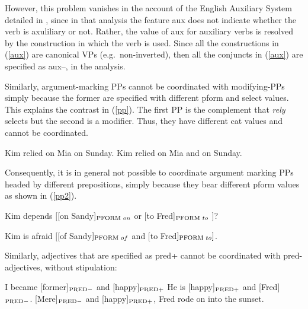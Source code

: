 \documentclass[output=paper]{langsci/langscibook}
\begin{document}
\noindent
However, this problem vanishes in the account of the English Auxiliary System detailed in \citet{SagEtAl20}, since in that analysis
the feature {\sc aux} does not indicate whether the verb is axuliliary or not. Rather, the value of {\sc aux} for auxiliary verbs is resolved by the construction in which the verb is used. Since all the constructions in (\ref{aux}) are canonical VPs (e.g.\ non-inverted), then 
all the conjuncts in (\ref{aux}) are specified as {\sc aux--}, in
the \citet{SagEtAl20} analysis.




Similarly, argument-marking PPs cannot be coordinated with modifying-PPs simply because the former are specified with different  {\sc pform} and {\sc select} values. This explains the contrast
in (\ref{pp}). The first PP is the complement that {\it rely}
selects but the second is a modifier. Thus, they have different {\sc cat} values and cannot be coordinated.


\begin{exe}
\ex
\begin{xlista}
\ex Kim relied on Mia on Sunday.
\ex *Kim relied on Mia and on Sunday.
\end{xlista}\label{pp}
\end{exe}

\noindent
Consequently, it is in general not possible to coordinate argument marking PPs headed by different prepositions, simply because they bear
different {\sc pform} values as shown in (\ref{pp2}).

\begin{exe}
\ex
\begin{xlista}
\ex *Kim depends  $[$[on Sandy]$_{\textup{\scriptsize PFORM} \,\, on}$
                       or [to Fred]$_{\textup{\scriptsize PFORM} \,\, to}$ $]$?

\ex *Kim is afraid  $[[$of Sandy$]_{\textup{\scriptsize PFORM} \,\, of}$
                       and $[$to Fred$]_{\textup{\scriptsize PFORM} \,\, to} ]$.
\end{xlista}\label{pp2}
\end{exe}

Similarly, adjectives that are specified as {\sc pred+} cannot be
coordinated with  {\sc pred-} adjectives, without stipulation:

\begin{exe}
\ex
\begin{xlista}
  \ex{*}I became [former]$_{\textup{\scriptsize PRED} -}$ and [happy]$_{\textup{\scriptsize PRED} +}$
 \ex{*}He is  [happy]$_{\textup{\scriptsize PRED} +}$ and [Fred]$_{\textup{\scriptsize PRED} -}$.
  \ex{*}[Mere]$_{\textup{\scriptsize PRED} -}$ and [happy]$_{\textup{\scriptsize PRED} +}$, Fred rode on into the sunset.
 \end{xlista}
\end{exe}
\end{document}
